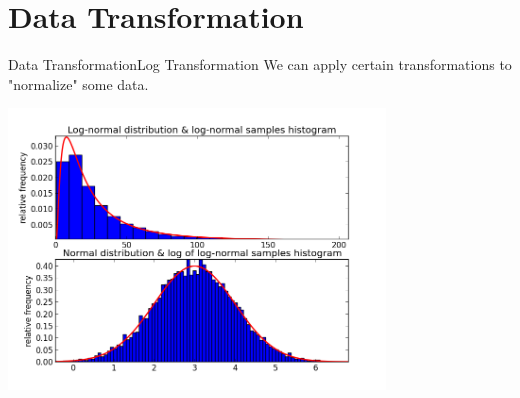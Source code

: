 %
%
%


\section{Data Transformation}

\begin{frame}{Data Transformation}{Log Transformation}
  We can apply certain transformations to "normalize" some data.
  \begin{center}
    \includegraphics[width=0.75\textwidth]{../img/lognormal_transformation}
  \end{center}
\end{frame}

